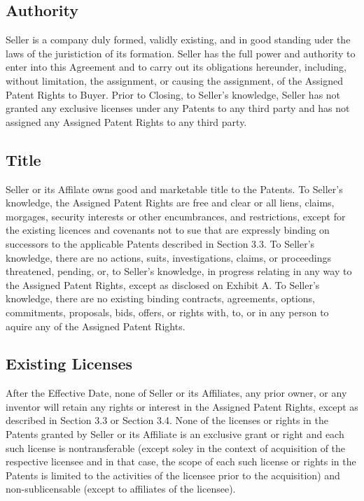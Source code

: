\documentclass[letterpaper,10pt,english]{sphinxmanual}
\begin{document}
\subsection{Authority}
\label{\detokenize{6-representations:authority}}
Seller is a company duly formed, validly existing, and in good standing uder the laws of the juristiction of its formation. Seller has the full power and authority to enter into this Agreement and to carry out its obligations hereunder, including, without limitation, the assignment, or causing the assignment, of the Assigned Patent Rights to Buyer. Prior to Closing, to Seller’s knowledge, Seller has not granted any exclusive licenses under any Patents to any third party and has not assigned any Assigned Patent Rights to any third party.


\subsection{Title}
\label{\detokenize{6-representations:title}}
Seller or its Affilate owns good and marketable title to the Patents. To Seller’s knowledge, the Assigned Patent Rights are free and clear or all liens, claims, morgages, security interests or other encumbrances, and restrictions, except for the existing licences and covenants not to sue that are expressly binding on successors to the applicable Patents described in Section 3.3. To Seller’s knowledge, there are no actions, suits, investigations, claims, or proceedings threatened, pending, or, to Seller’s knowledge, in progress relating in any way to the Assigned Patent Rights, except as disclosed on Exhibit A. To Seller’s knowledge, there are no existing binding contracts, agreements, options, commitments, proposals, bids, offers, or rights with, to, or in any person to aquire any of the Assigned Patent Rights.


\subsection{Existing Licenses}
\label{\detokenize{6-representations:existing-licenses}}
After the Effective Date, none of Seller or its Affiliates, any prior owner, or any inventor will retain any rights or interest in the Assigned Patent Rights, except as described in Section 3.3 or Section 3.4. None of the licenses or rights in the Patents granted by Seller or its Affiliate is an exclusive grant or right and each such license is nontransferable (except soley in the context of acquisition of the respective licensee and in that case, the scope of each such license or rights in the Patents is limited to the activities of the licensee prior to the acquisition) and non-sublicensable (except to affiliates of the licensee).
\end{document}
